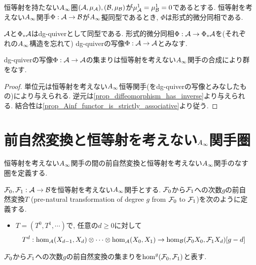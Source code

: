 \documentclass[uplatex, a4paper, 14Q, dvipdfmx]{jsarticle}
\begin{document}
\begin{example} \label{eg_Ainf_qis_with_zero_differential_is_formal_diffeo}
  恒等射を持たない$A_{\infty}$圏$(\mathcal{A},\mu_{\mathcal{A}}), (\mathcal{B},\mu_{\mathcal{B}})$が$\mu^1_{\mathcal{A}}=\mu^1_{\mathcal{B}}=0$であるとする.
  恒等射を考えない$A_{\infty}$関手$\Phi : \mathcal{A} \to \mathcal{B}$が$A_{\infty}$擬同型であるとき, $\Phi$は形式的微分同相である. 
\end{example}

$\mathcal{A}$と$\Phi_\ast \mathcal{A}$はdg-quiverとして同型である. 
形式的微分同相$\Phi : \mathcal{A} \to \Phi_\ast \mathcal{A}$を(それぞれの$A_{\infty}$構造を忘れて) dg-quiverの写像$\Phi: \mathcal{A} \to \mathcal{A}$とみなす.

\begin{lemma}
  dg-quiverの写像$\Phi : \mathcal{A} \to \mathcal{A}$の集まりは恒等射を考えない$A_{\infty}$関手の合成により群をなす.
\end{lemma}

\begin{proof}
  単位元は恒等射を考えない$A_{\infty}$恒等関手(をdg-quiverの写像とみなしたもの)により与えられる.
  逆元は\cref{prop_diffeomorphism_has_inverse}より与えられる. 
  結合性は\cref{prop_Ainf_functor_is_strictly_associative}より従う. 
\end{proof}

\section{前自然変換と恒等射を考えない\texorpdfstring{$A_{\infty}$}{Ainf}関手圏} \label{section_non_unital_Ainf_functor_cat}

恒等射を考えない$A_{\infty}$関手の間の前自然変換と恒等射を考えない$A_{\infty}$関手のなす圏を定義する. 

\begin{definition}[前自然変換]
  $\mathcal{F}_0,\mathcal{F}_1 : \mathcal{A} \to \mathcal{B}$を恒等射を考えない$A_{\infty}$関手とする. 
  $\mathcal{F}_0$から$\mathcal{F}_1$への次数$g$の前自然変換$T$ (pre-natural transformation of degree $g$ from $\mathcal{F}_0$ to $\mathcal{F}_1$)を次のように定義する. 
  \begin{itemize}
    \item $T = (T^0, T^1, \cdots)$で, 任意の$d \geq 0$に対して
    \begin{align*}
      T^d : \hom_{\mathcal{A}}(X_{d-1},X_d) \otimes \cdots \otimes \hom_{\mathcal{A}}(X_0,X_1) \to \hom_{\mathcal{B}}(\mathcal{F}_0 X_0,\mathcal{F}_1 X_d)[g-d]
    \end{align*}
  \end{itemize}
  $\mathcal{F}_0$から$\mathcal{F}_1$への次数$g$の前自然変換の集まりを$\hom^g(\mathcal{F}_0,\mathcal{F}_1)$と表す. 
\end{definition}
\end{document}
